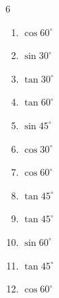 \begin{multicols}{6}
\begin{enumerate}
  \item $\displaystyle \cos{60^\circ}$


  \item $\displaystyle \sin{30^\circ}$


  \item $\displaystyle \tan{30^\circ}$


  \item $\displaystyle \tan{60^\circ}$


  \item $\displaystyle \sin{45^\circ}$


  \item $\displaystyle \cos{30^\circ}$


  \item $\displaystyle \cos{60^\circ}$


  \item $\displaystyle \tan{45^\circ}$

        \phantom{$\displaystyle =1$}

  \item $\displaystyle \tan{45^\circ}$

        \phantom{$\displaystyle =1$}

  \item $\displaystyle \sin{60^\circ}$


  \item $\displaystyle \tan{45^\circ}$

        \phantom{$\displaystyle =1$}

  \item $\displaystyle \cos{60^\circ}$


\columnbreak %

\resetques


\end{enumerate}
\end{multicols}
